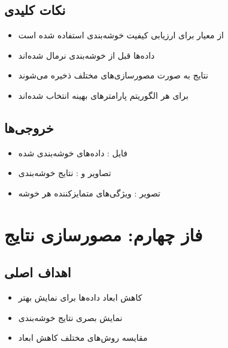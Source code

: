 \documentclass[a4paper,12pt]{article}
\let\nobreaksection\section
\renewcommand{\section}{\nobreaksection}
\begin{document}
	\subsection{نکات کلیدی}
	\begin{itemize}
		\item از معیار  برای ارزیابی کیفیت خوشه‌بندی استفاده شده است
		\item داده‌ها قبل از خوشه‌بندی نرمال شده‌اند
		\item نتایج به صورت مصورسازی‌های مختلف ذخیره می‌شوند
		\item برای هر الگوریتم پارامترهای بهینه انتخاب شده‌اند
	\end{itemize}
	
	\subsection{خروجی‌ها}
	\begin{itemize}
		\item فایل : داده‌های خوشه‌بندی شده
		\item تصاویر  و : نتایج خوشه‌بندی
		\item تصویر : ویژگی‌های متمایزکننده هر خوشه
	\end{itemize}
	
	\section{فاز چهارم: مصورسازی نتایج}
	
	\subsection{اهداف اصلی}
	\begin{itemize}
		\item کاهش ابعاد داده‌ها برای نمایش بهتر
		\item نمایش بصری نتایج خوشه‌بندی
		\item مقایسه روش‌های مختلف کاهش ابعاد
	\end{itemize}
	
\end{document}
